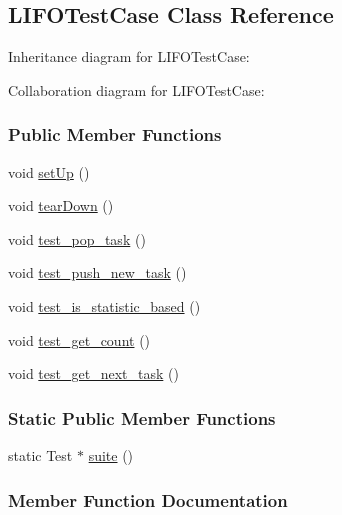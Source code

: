 \hypertarget{a00023}{}\subsection{L\+I\+F\+O\+Test\+Case Class Reference}
\label{a00023}


Inheritance diagram for L\+I\+F\+O\+Test\+Case\+:


Collaboration diagram for L\+I\+F\+O\+Test\+Case\+:
\subsubsection*{Public Member Functions}
\begin{DoxyCompactItemize}
\item 
void \hyperlink{a00023_a4a028862ef1179061435da3ca058670e}{set\+Up} ()
\item 
void \hyperlink{a00023_aa83dba5d549606eba6a54cce4f21c52e}{tear\+Down} ()
\item 
void \hyperlink{a00023_a99cbee000f0fb1ab639d7bd69faeca06}{test\+\_\+pop\+\_\+task} ()
\item 
void \hyperlink{a00023_af5481343cc459b8f16618d13314ecdc0}{test\+\_\+push\+\_\+new\+\_\+task} ()
\item 
void \hyperlink{a00023_aa9073edb510daef4051de7e76b27d6ec}{test\+\_\+is\+\_\+statistic\+\_\+based} ()
\item 
void \hyperlink{a00023_af7883d3964f2e57802cee6b14be48bb4}{test\+\_\+get\+\_\+count} ()
\item 
void \hyperlink{a00023_a30a895909a806d006c59bdaae9f1a1c9}{test\+\_\+get\+\_\+next\+\_\+task} ()
\end{DoxyCompactItemize}
\subsubsection*{Static Public Member Functions}
\begin{DoxyCompactItemize}
\item 
static Test $\ast$ \hyperlink{a00023_a0bd464ab76c423a53368ebf25577af8e}{suite} ()
\end{DoxyCompactItemize}


\subsubsection{Member Function Documentation}
\hypertarget{a00023_a4a028862ef1179061435da3ca058670e}{}
